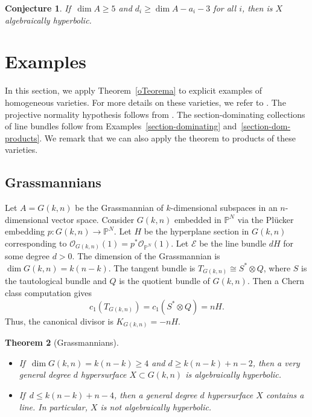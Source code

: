 \documentclass[11pt]{amsart}
\numberwithin{equation}{section}
\newtheorem{theorem}{Theorem}[section]
\newtheorem{conjecture}[theorem]{Conjecture}
\theoremstyle{definition}
\theoremstyle{remark}
\newcommand{\cO}{\mathcal{O}}
\renewcommand{\P}{\mathbb{P}}
\begin{document}
\begin{conjecture}\label{dim_5_conjecture}
    If\, $\dim A\ge 5$ and $d_i\ge \dim A - a_i - 3$ for all $i$, then is $X$ algebraically hyperbolic.
\end{conjecture}

\section{Examples}\label{sec5}

In this section, we apply Theorem~\ref{oTeorema} to explicit examples of homogeneous varieties. For more details on these varieties, we refer to \cite{IMPANGA}. The projective normality hypothesis follows from \cite{RR85}. The section-dominating collections of line bundles follow from Examples~\ref{section-dominating} and~\ref{section-dom-products}. We remark that we can also apply the theorem to products of these varieties.

\subsection{Grassmannians}

Let $A = G(k,n)$ be the Grassmannian of $k$-dimensional subspaces in an $n$-dimensional vector space. Consider $G(k,n)$ embedded in $\P^N$ via the Pl\"ucker embedding $p\colon G(k,n)\to \P^N$. Let $H$ be the hyperplane section in $G(k,n)$ corresponding to $\cO_{G(k,n)}(1) = p^*\cO_{\P^N}(1)$. Let $\mathcal{E}$ be the line bundle $dH$ for some degree $d>0$. The dimension of the Grassmannian is $\dim G(k,n) = k(n-k)$. The tangent bundle is $T_{G(k,n)}\cong S^*\otimes Q$, where $S$ is the tautological bundle and $Q$ is the quotient bundle of $G(k,n)$. Then a Chern class computation gives
\[ c_1(T_{G(k,n)}) = c_1(S^*\otimes Q) = nH. \]
Thus, the canonical divisor is $K_{G(k,n)} = -nH$.

\begin{theorem}[Grassmannians]
\leavevmode
  \begin{itemize}
    \item If\, $\dim G(k,n) = k(n-k)\ge 4$ and $d\ge k(n-k)+n-2$, then a very general degree $d$ hypersurface $X\subset G(k,n)$ is algebraically hyperbolic.
    \item If\, $d\le k(n-k)+n-4$, then a general degree $d$ hypersurface $X$ contains a line. In particular, $X$ is not algebraically hyperbolic.
\end{itemize}
\end{theorem}
\end{document}
